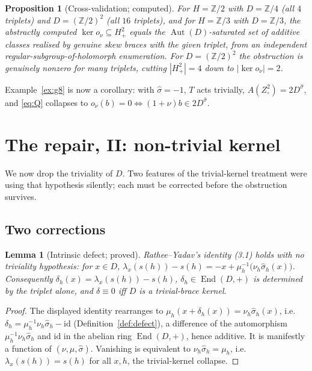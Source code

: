 \documentclass[11pt,reqno]{amsart}
\theoremstyle{plain}
\newtheorem{proposition}[theorem]{Proposition}
\newtheorem{lemma}[theorem]{Lemma}
\theoremstyle{definition}
\newcommand{\Z}{\mathbb{Z}}
\newcommand{\id}{\mathrm{id}}
\newcommand{\Aut}{\operatorname{Aut}}
\newcommand{\End}{\operatorname{End}}
\newcommand{\shat}{\widehat{\sigma}}
\begin{document}
\begin{proposition}[Cross-validation; computed]\label{prop:cross}
For $H=\Z/2$ with $D=\Z/4$ (all $4$ triplets) and $D=(\Z/2)^2$ (all $16$ triplets), and for
$H=\Z/3$ with $D=\Z/3$, the abstractly computed $\ker o_\nu\subseteq H^2_+$ equals the
$\Aut(D)$-saturated set of additive classes realised by genuine skew braces with the given
triplet, from an independent regular-subgroup-of-holomorph enumeration. For $D=(\Z/2)^2$
the obstruction is genuinely nonzero for many triplets, cutting $|H^2_+|=4$ down to
$|\ker o_\nu|=2$.
\end{proposition}

Example~\ref{ex:g8} is now a corollary: with $\shat=-1$, $T$ acts trivially,
$A(Z^2_\circ)=2D^{\shat}$, and \eqref{eq:Q} collapses to
$o_\nu(b)=0\iff(1+\nu)b\in2D^{\shat}$.

\section{The repair, II: non-trivial kernel}\label{sec:repairII}

We now drop the triviality of $D$. Two features of the trivial-kernel treatment were using
that hypothesis silently; each must be corrected before the obstruction survives.

\subsection{Two corrections}

\begin{lemma}[Intrinsic defect; proved]\label{lem:defect}
Rathee--Yadav's identity (3.1) holds with no triviality hypothesis: for $x\in D$,
$\lambda_x(s(h))-s(h)=-x+\mu_h^{-1}\big(\nu_h\shat_h(x)\big)$. Consequently
$\delta_h(x)=\lambda_x(s(h))-s(h)$, $\delta_h\in\End(D,+)$ is determined by the triplet
alone, and $\delta\equiv0$ iff $D$ is a trivial-brace kernel.
\end{lemma}
\begin{proof}
The displayed identity rearranges to $\mu_h(x+\delta_h(x))=\nu_h\shat_h(x)$, i.e.\
$\delta_h=\mu_h^{-1}\nu_h\shat_h-\id$ (Definition~\ref{def:defect}), a difference of the
automorphism $\mu_h^{-1}\nu_h\shat_h$ and $\id$ in the abelian ring $\End(D,+)$, hence
additive. It is manifestly a function of $(\nu,\mu,\shat)$. Vanishing is equivalent to
$\nu_h\shat_h=\mu_h$, i.e.\ $\lambda_x(s(h))=s(h)$ for all $x,h$, the trivial-kernel
collapse.
\end{proof}
\end{document}
